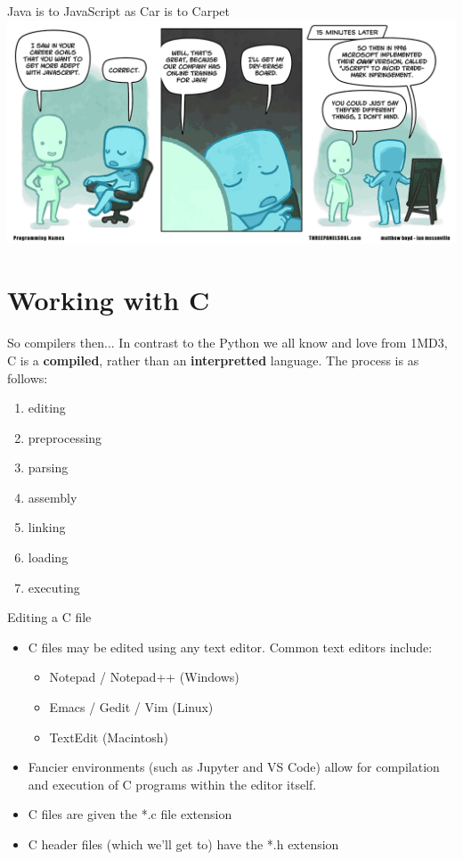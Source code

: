 \documentclass[11pt]{beamer}
\begin{document}
\begin{frame}{Java is to JavaScript as Car is to Carpet}
\center
\includegraphics[scale=0.3]{javascript.png}
\end{frame}

\section[Working with C]{Working with C}
\begin{frame}{So compilers then...}
In contrast to the Python we all know and love from 1MD3, C is a \textbf{compiled}, rather than an \textbf{interpretted} language.  The process is as follows: 
\begin{enumerate}
\item editing
\item preprocessing
\item parsing
\item assembly
\item linking
\item loading 
\item executing
\end{enumerate}
\end{frame}

\begin{frame}{Editing a C file}
\begin{itemize}
\item C files may be edited using any text editor.  Common text editors include:
	\begin{itemize}
	\item Notepad / Notepad++ (Windows)
	\item Emacs / Gedit / Vim (Linux)
	\item TextEdit (Macintosh)
	\end{itemize}
\item Fancier environments (such as Jupyter and VS Code) allow for compilation and execution of C programs within the editor itself.
\item C files are given the *.c file extension
\item C header files (which we'll get to) have the *.h extension 
\end{itemize}
\end{frame}
\end{document}
